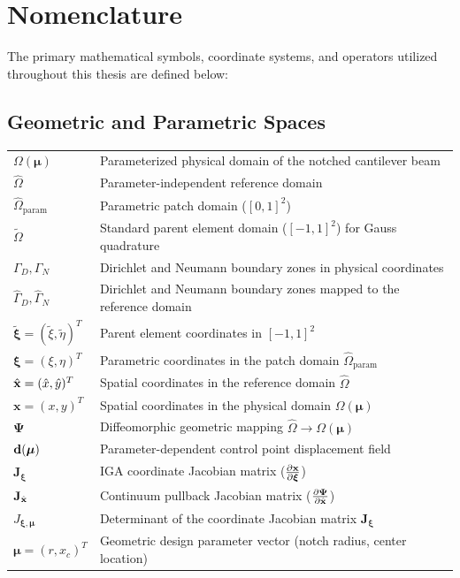 \chapter*{Nomenclature}

\noindent The primary mathematical symbols, coordinate systems, and operators utilized throughout this thesis are defined below:

\section*{Geometric and Parametric Spaces}
\begin{tabular}{p{3.0cm} p{11.0cm}}
    $\Omega(\boldsymbol{\mu})$ & Parameterized physical domain of the notched cantilever beam \\
    $\hat{\Omega}$              & Parameter-independent reference domain \\
    $\hat{\Omega}_{\text{param}}$ & Parametric patch domain ($[0,1]^2$) \\
    $\tilde{\Omega}$            & Standard parent element domain ($[-1,1]^2$) for Gauss quadrature \\
    $\Gamma_D, \Gamma_N$        & Dirichlet and Neumann boundary zones in physical coordinates \\
    $\hat{\Gamma}_D, \hat{\Gamma}_N$ & Dirichlet and Neumann boundary zones mapped to the reference domain \\
    $\tilde{\boldsymbol{\xi}} = (\tilde{\xi}, \tilde{\eta})^T$ & Parent element coordinates in $[-1,1]^2$ \\
    $\boldsymbol{\xi} = (\xi, \eta)^T$ & Parametric coordinates in the patch domain $\hat{\Omega}_{\text{param}}$ \\
    $\hat{\mathbf{x}} = (\hat{x}, \hat{y})^T$ & Spatial coordinates in the reference domain $\hat{\Omega}$ \\
    $\boldsymbol{x} = (x, y)^T$ & Spatial coordinates in the physical domain $\Omega(\boldsymbol{\mu})$ \\
    $\boldsymbol{\Psi}$          & Diffeomorphic geometric mapping $\hat{\Omega} \to \Omega(\boldsymbol{\mu})$ \\
    $\mathbf{d}(\boldsymbol{\mu})$ & Parameter-dependent control point displacement field \\
    $\mathbf{J}_{\boldsymbol{\xi}}$ & IGA coordinate Jacobian matrix ($\frac{\partial \mathbf{x}}{\partial \boldsymbol{\xi}}$) \\
    $\mathbf{J}_{\hat{\mathbf{x}}}$   & Continuum pullback Jacobian matrix ($\frac{\partial \boldsymbol{\Psi}}{\partial \hat{\mathbf{x}}}$) \\
    $J_{\boldsymbol{\xi}, \boldsymbol{\mu}}$ & Determinant of the coordinate Jacobian matrix $\mathbf{J}_{\boldsymbol{\xi}}$ \\
    $\boldsymbol{\mu} = (r, x_c)^T$ & Geometric design parameter vector (notch radius, center location) \\
\end{tabular}

